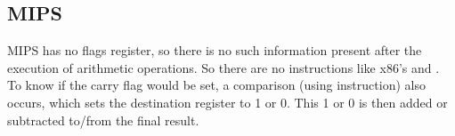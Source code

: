 \subsection{MIPS}



MIPS has no flags register, so there is no such information present after the execution of arithmetic operations.
So there are no instructions like x86's  and .
To know if the carry flag would be set, a comparison (using  instruction) also occurs, 
which sets the destination register to 1 or 0.
This 1 or 0 is then added or subtracted to/from the final result.

